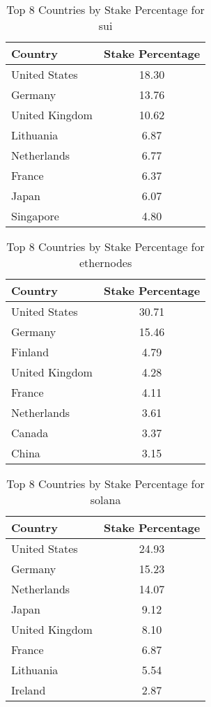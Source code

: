 \documentclass{article}
\begin{document}
\appendix

\begin{table}[htbp]
    \centering
    \caption{Top 8 Countries by Stake Percentage for sui}
    \begin{tabular}{|l|c|}
    \hline
    Country & Stake Percentage \\
    \hline
    United States & 18.30 \\
Germany & 13.76 \\
United Kingdom & 10.62 \\
Lithuania & 6.87 \\
Netherlands & 6.77 \\
France & 6.37 \\
Japan & 6.07 \\
Singapore & 4.80 \\
\hline
\end{tabular}
\end{table}

\begin{table}[htbp]
    \centering
    \caption{Top 8 Countries by Stake Percentage for ethernodes}
    \begin{tabular}{|l|c|}
    \hline
    Country & Stake Percentage \\
    \hline
    United States & 30.71 \\
Germany & 15.46 \\
Finland & 4.79 \\
United Kingdom & 4.28 \\
France & 4.11 \\
Netherlands & 3.61 \\
Canada & 3.37 \\
China & 3.15 \\
\hline
\end{tabular}
\end{table}

\begin{table}[htbp]
    \centering
    \caption{Top 8 Countries by Stake Percentage for solana}
    \begin{tabular}{|l|c|}
    \hline
    Country & Stake Percentage \\
    \hline
    United States & 24.93 \\
Germany & 15.23 \\
Netherlands & 14.07 \\
Japan & 9.12 \\
United Kingdom & 8.10 \\
France & 6.87 \\
Lithuania & 5.54 \\
Ireland & 2.87 \\
\hline
\end{tabular}
\end{table}
\end{document}
